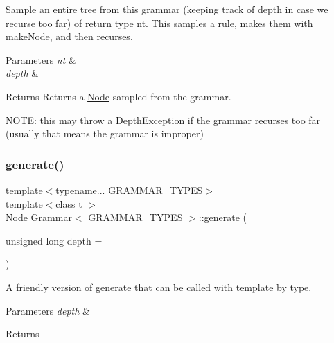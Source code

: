Sample an entire tree from this grammar (keeping track of depth in case we recurse too far) of return type nt. This samples a rule, makes them with make\+Node, and then recurses. 
\begin{DoxyParams}{Parameters}
{\em nt} & \\
\hline
{\em depth} & \\
\hline
\end{DoxyParams}
\begin{DoxyReturn}{Returns}
Returns a \hyperlink{class_node}{Node} sampled from the grammar.
\end{DoxyReturn}
N\+O\+TE\+: this may throw a Depth\+Exception if the grammar recurses too far (usually that means the grammar is improper)\mbox{\label{class_grammar_a01bf556e22bfdd5ec87868869fd9330f}} 
\subsubsection{\texorpdfstring{generate()}{generate()}\hspace{0.1cm}{\footnotesize\ttfamily [2/2]}}
{\footnotesize\ttfamily template$<$typename... G\+R\+A\+M\+M\+A\+R\+\_\+\+T\+Y\+P\+ES$>$ \\
template$<$class t $>$ \\
\hyperlink{class_node}{Node} \hyperlink{class_grammar}{Grammar}$<$ G\+R\+A\+M\+M\+A\+R\+\_\+\+T\+Y\+P\+ES $>$\+::generate (\begin{DoxyParamCaption}\item[{unsigned long}]{depth = {} }\end{DoxyParamCaption})\hspace{0.3cm}{\ttfamily [inline]}}

A friendly version of generate that can be called with template by type. 
\begin{DoxyParams}{Parameters}
{\em depth} & \\
\hline
\end{DoxyParams}
\begin{DoxyReturn}{Returns}

\end{DoxyReturn}
\mbox{\label{class_grammar_a1e192e96e623cf9beb927cbd35bd7470}} 

